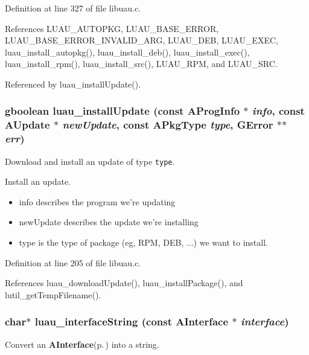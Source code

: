 Definition at line 327 of file libuau.c.

References LUAU\_\-AUTOPKG, LUAU\_\-BASE\_\-ERROR, LUAU\_\-BASE\_\-ERROR\_\-INVALID\_\-ARG, LUAU\_\-DEB, LUAU\_\-EXEC, luau\_\-install\_\-autopkg(), luau\_\-install\_\-deb(), luau\_\-install\_\-exec(), luau\_\-install\_\-rpm(), luau\_\-install\_\-src(), LUAU\_\-RPM, and LUAU\_\-SRC.

Referenced by luau\_\-install\-Update().
\subsubsection{\setlength{\rightskip}{0pt plus 5cm}gboolean luau\_\-install\-Update (const {\bf AProg\-Info} $\ast$ {\em info}, const {\bf AUpdate} $\ast$ {\em new\-Update}, const {\bf APkg\-Type} {\em type}, GError $\ast$$\ast$ {\em err})}\label{libuau_8c_a10}


Download and install an update of type {\tt type}. 

Install an update.

\begin{itemize}
\item info describes the program we're updating \item new\-Update describes the update we're installing \item type is the type of package (eg, RPM, DEB, ...) we want to install. 
\end{itemize}


Definition at line 205 of file libuau.c.

References luau\_\-download\-Update(), luau\_\-install\-Package(), and lutil\_\-get\-Temp\-Filename().
\subsubsection{\setlength{\rightskip}{0pt plus 5cm}char$\ast$ luau\_\-interface\-String (const {\bf AInterface} $\ast$ {\em interface})}\label{libuau_8c_a42}


Convert an {\bf AInterface}{\rm (p.\,\pageref{structAInterface})} into a string. 

